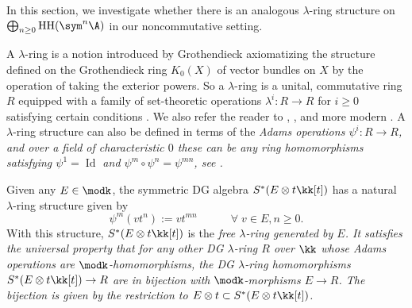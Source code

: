 \documentclass[12pt,a4paper,reqno]{amsart}
\DeclareMathOperator{\id}{Id}
\DeclareMathOperator{\hochhom}{{HH}}
\begin{document}
In this section, we investigate whether there is an analogous
$\lambda$-ring structure on $\bigoplus_{n \geq 0} \hochhom(\sym^n \A)$
in our noncommutative setting. 

A $\lambda$-ring is a notion introduced by Grothendieck 
\cite[\S{I}.1-2]{Grothendieck-ClassesDeFaisceauxEtTheoremeDeRiemannRoch}
axiomatizing the structure defined on the Grothendieck ring $K_0(X)$
of vector bundles on $X$ by the operation of taking the exterior powers. 
So a $\lambda$-ring is a unital, commutative
ring $R$ equipped with a family of set-theoretic operations
$\lambda^i\colon R \rightarrow R$ for $i \geq 0$ satisfying
certain conditions 
\cite[\S{I}.1-2]{Grothendieck-ClassesDeFaisceauxEtTheoremeDeRiemannRoch}
\cite[Déf.~2.4]{Berthelot-GeneralitesSurLesLambdaAnneaux}. 
We also refer the reader to
\cite{Knutson-LambdaRingsAndTheRepresentationTheoryOfTheSymmetricGroup}, 
\cite{AtiyahTall-GroupRepresentationsLambdaRingsAndTheJHomomorphism}, 
and more modern \cite{Yau-LambdaRings}. A $\lambda$-ring structure can also be 
defined in terms of the \em Adams operations \rm $\psi^i\colon R
\rightarrow R$, and over a field of characteristic $0$
these can be any ring homomorphisms satisfying $\psi^1 = \id$ and $\psi^{m} \circ \psi^{n} = \psi^{mn}$,
see 
\cite[p.~49]{Knutson-LambdaRingsAndTheRepresentationTheoryOfTheSymmetricGroup}
\cite[Prop.~1.2]{Wilkerson-LambdaRingsBinomialDomainsAndVectorBundlesOverCPInfty}.

Given any $E \in \modk$, the symmetric DG algebra $S^*(E \otimes t\kk[t])$ 
has a natural $\lambda$-ring structure given by 
\begin{equation}
\label{eqn-free-lambda-ring-structure-on-symmetric-algebra-of-E-tkt}
\psi^{m}(v t^n) := v t^{mn} \quad \quad \quad \forall\; v \in E, n \geq 0. 
\end{equation}
With this structure, $S^*(E \otimes t\kk[t])$ is the \em free
$\lambda$-ring generated by $E$\rm. It satisfies the universal
property that for any other DG $\lambda$-ring $R$ over $\kk$ whose Adams
operations are $\modk$-homomorphisms, the DG $\lambda$-ring
homomorphisms $S^*(E \otimes t\kk[t]) \rightarrow R$ are in bijection
with $\modk$-morphisms $E \rightarrow R$. The bijection
is given by the restriction to $E \otimes t \subset S^*(E \otimes
t\kk[t])$. 
\end{document}
